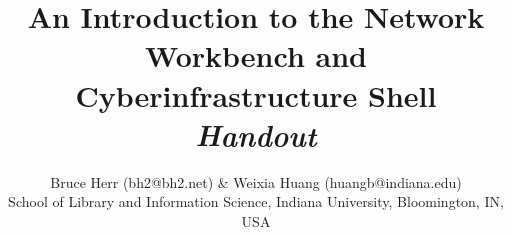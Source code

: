 \documentclass[10pt,letterpaper, twoside]{article}
\title{An Introduction to the Network Workbench and Cyberinfrastructure Shell \\
\textit{Handout}}
\author{Bruce Herr (bh2@bh2.net) & Weixia Huang (huangb@indiana.edu) \\
\small{School of Library and Information Science, Indiana University,
Bloomington, IN, USA}}
\date{}
\begin{document}
\maketitle

\begin{multicols*}{2}{







}
\end{multicols*}
\end{document}

